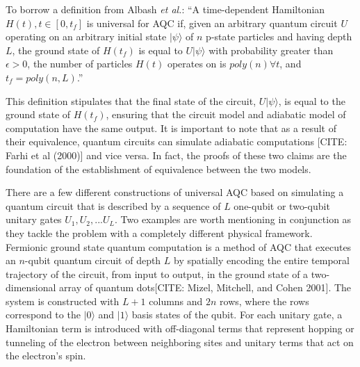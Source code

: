 \documentclass[%
 reprint,
 amsmath,amssymb,
 aps,
]{revtex4-1}
\begin{document}
   To borrow a definition from Albash \textit{et al.}: ``A time-dependent Hamiltonian $H(t), t\in [0,t_{f}]$ is universal for AQC if, given an arbitrary quantum circuit $U$ operating on an arbitrary initial state $\vert\psi\rangle$ of $n$ p-state particles and having depth $L$, the ground state of $H(t_f)$ is equal to $U\vert\psi\rangle$ with probability greater than $\epsilon>0$, the number of particles $H(t)$ operates on is $poly(n) \forall t$, and $t_f = poly(n,L)$\cite{RevModPhys.90.015002}.''
   
   This definition stipulates that the final state of the circuit, $U\vert\psi\rangle$, is equal to the ground state of $H(t_f)$, ensuring that the circuit model and adiabatic model of computation have the same output. It is important to note that as a result of their equivalence, quantum circuits can simulate adiabatic computations [CITE: Farhi et al (2000)]  and vice versa\cite{Aharanov2007}. In fact, the proofs of these two claims are the foundation of the establishment of equivalence between the two models.
   
   There are a few different constructions of universal AQC based on simulating a quantum circuit that is described by a sequence of $L$ one-qubit or two-qubit unitary gates $U_1 , U_2 , ... U_L$. Two examples are worth mentioning in conjunction as they tackle the problem with a completely different physical framework. Fermionic ground state quantum computation is a method of AQC that executes an $n$-qubit quantum circuit of depth $L$ by spatially encoding the entire temporal trajectory of the circuit, from input to output, in the ground state of a two-dimensional array of quantum dots[CITE: Mizel, Mitchell, and Cohen 2001]. The system is constructed with $L+1$ columns and $2n$ rows, where the rows correspond to the $\vert 0 \rangle$ and $\vert 1 \rangle$ basis states of the qubit. For each unitary gate, a Hamiltonian term is introduced with off-diagonal terms that represent hopping or tunneling of the electron between neighboring sites and unitary terms that act on the electron's spin.

\end{document}
